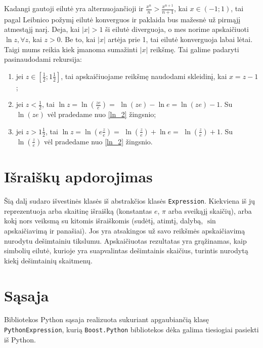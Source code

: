 Kadangi gautoji eilutė yra alternuojančioji ir 
$\frac{x^n}{n} > \frac{x^{n+1}}{n+1}$, kai $x \in (-1; 1)$, tai pagal 
Leibnico požymį eilutė konverguos ir paklaida bus mažesnė už pirmąjį
atmestąjį narį. Deja, kai $|x| > 1$ ši eilutė diverguoja, o mes
norime apskaičiuoti $\ln z, \forall z$, kai $z > 0$. Be to, 
kai $|x|$ artėja prie 1, tai eilutė konverguoja labai lėtai. Taigi
mums reikia kiek įmanoma sumažinti $|x|$ reikšmę. Tai galime padaryti
pasinaudodami rekursija:
\begin{enumerate}
  \item \label{ln_2} jei $z \in \left[ \frac{1}{2}; 1\frac{1}{2} \right]$, 
    tai apskaičiuojame reikšmę naudodami skleidinį, kai $x = z - 1$;
  \item jei $z < \frac{1}{2}$, tai 
    $\ln z = \ln \left( \frac{ze}{e} \right) =$
    $\ln (ze) - \ln e = \ln (ze) - 1$. Su $\ln (ze)$ vėl pradedame
    nuo \ref{ln_2} žingsnio;
  \item jei $z > 1\frac{1}{2}$, tai 
    $\ln z = \ln \left( e\frac{z}{e} \right) =$
    $\ln \left( \frac{z}{e} \right) + \ln e =$
    $\ln \left( \frac{z}{e} \right) + 1$. Su 
    $\ln \left( \frac{z}{e} \right)$ vėl pradedame nuo \ref{ln_2}
    žingsnio.
\end{enumerate}

\section{Išraiškų apdorojimas}

Šią dalį sudaro išvestinės klasės iš abstrakčios klasės \verb|Expression|.
Kiekviena iš jų reprezentuoja arba skaitinę išraišką (konstantas $e$,
$\pi$ arba sveikąjį skaičių), arba kokį nors veiksmą su kitomis išraiškomis
(sudėtį, atimtį, dalybą, $\sin$ apskaičiavimą ir panašiai). Jos yra 
atsakingos už savo reikšmės apskaičiavimą nurodytu dešimtainiu tikslumu.
Apskaičiuotas rezultatas yra grąžinamas, kaip simbolių eilutė, kurioje yra
suapvalintas dešimtainis skaičius, turintis nurodytą kiekį dešimtainių
skaitmenų.

\section{Sąsaja}

Bibliotekos Python sąsaja realizuota sukuriant apgaubiančią klasę
\verb|PythonExpression|, kurią \verb|Boost.Python| bibliotekos dėka
galima tiesiogiai pasiekti iš Python.
